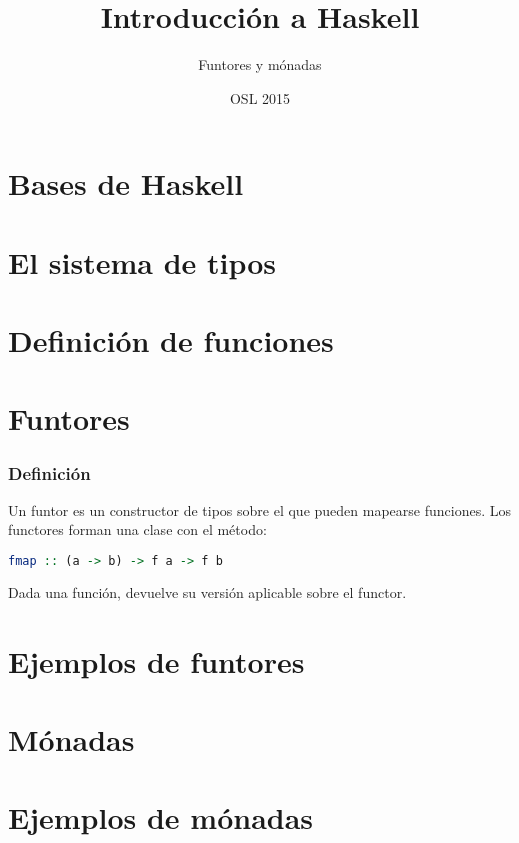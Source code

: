 \documentclass{beamer} %
\title{Introducción a Haskell}  %
\subtitle{Funtores y mónadas}   %
\author[@pbaeyens \and @M42]    %
{\texorpdfstring{
    \begin{columns}
      \column{.45\linewidth}
      \centering
      Pablo Baeyens\\
      \href{http://www.github.com/pbaeyens}{@pbaeyens}
      \column{.45\linewidth}
      \centering
      Mario Román\\
      \href{http://www.github.com/M42}{@M42}
    \end{columns}
}{Pablo Baeyens \and Mario Román}}
\date{OSL 2015} %
\begin{document}
  \frame{\titlepage}



  \section{Bases de Haskell}
  \section{El sistema de tipos}
  \section{Definición de funciones}
  
  \section{Funtores}
     \begin{frame}[fragile]
       \frametitle{Definición}
       Un funtor es un constructor de tipos sobre el que pueden mapearse funciones. 
       Los functores forman una clase con el método:
       \begin{lstlisting}[language=Haskell]
         fmap :: (a -> b) -> f a -> f b
       \end{lstlisting}
       Dada una función, devuelve su versión aplicable sobre el functor.
\end{frame}
   
  \section{Ejemplos de funtores}
  \section{Mónadas}
  \section{Ejemplos de mónadas}
\end{document}
